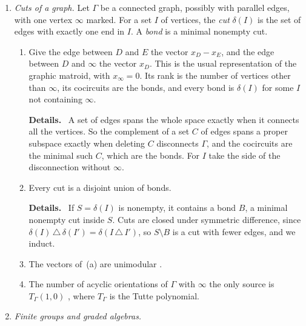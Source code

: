\documentclass[11pt]{amsart}
\newenvironment{details}{\par\color{black!60!green}\noindent\textbf{Details.}\ }{\par}
\begin{document}
\begin{enumerate}[leftmargin=2.6em,label=(I\arabic*)]
\begin{enumerate}[label=(\alph*)]
arrangement \cite[Cor.~8.4]{hauselToricHyperKahler2002}, which is dual to the matroid of
the $u_i$; so it is the cographic matroid when the $u_i$ are the vectors of a
graph.  For a matroid $\mathcal M$ of rank $r$ the top $h$-number is
$T_{\mathcal M}(0,1)$, and $T_{\mathcal M^*}(x,y)=T_{\mathcal M}(y,x)$, where $T$ is
the Tutte polynomial.
\end{enumerate}
\item\label{I:cuts} \emph{Cuts of a graph.}  Let $\Gamma$ be a connected graph,
possibly with parallel edges, with one vertex $\infty$ marked.  For a set $I$
of vertices, the \emph{cut} $\delta(I)$ is the set of edges with exactly one
end in $I$.  A \emph{bond} is a minimal nonempty cut.
\begin{enumerate}[label=(\alph*)]
\item Give the edge between $D$ and $E$ the vector $x_D-x_E$, and the edge
between $D$ and $\infty$ the vector $x_D$.  This is the usual representation of
the graphic matroid, with $x_\infty=0$.  Its rank is the number of vertices
other than $\infty$, its cocircuits are the bonds, and every bond is
$\delta(I)$ for some $I$ not containing $\infty$.
\begin{details}
A set of edges spans the whole space exactly when it
connects all the vertices.  So the complement of a set $C$ of edges spans a
proper subspace exactly when deleting $C$ disconnects $\Gamma$, and the
cocircuits are the minimal such $C$, which are the bonds.  For $I$ take the
side of the disconnection without $\infty$.
\end{details}
\item Every cut is a disjoint union of bonds.
\begin{details}
If $S=\delta(I)$ is
nonempty, it contains a bond $B$, a minimal nonempty cut inside $S$.  Cuts are
closed under symmetric difference, since
$\delta(I)\,\triangle\,\delta(I')=\delta(I\,\triangle\,I')$, so $S\setminus B$
is a cut with fewer edges, and we induct.
\end{details}
\item The vectors of~(a) are unimodular \cite[Lemma~8.1]{hauselToricHyperKahler2002}.
\item The number of acyclic orientations of $\Gamma$ with $\infty$ the only
source is $T_\Gamma(1,0)$ \cite{greeneInterpretationWhitney1983}, where $T_\Gamma$ is the
Tutte polynomial.
\end{enumerate}
\item\label{I:alg} \emph{Finite groups and graded algebras.}
\begin{enumerate}[label=(\alph*)]

\end{enumerate}
\end{enumerate}
\end{document}
